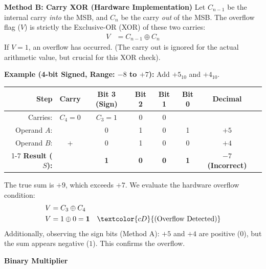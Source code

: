 \documentclass[12pt,a3paper]{article}
\newcommand{\subtopic}[2]{%
  \vspace{10pt}
  \noindent\begin{tcolorbox}[colback=#1!8,colframe=#1,boxrule=0.6pt,arc=4pt,
    left=6pt,right=6pt,top=4pt,bottom=4pt]
    \small\bfseries\textcolor{#1}{#2}
  \end{tcolorbox}
  \vspace{2pt}
}
\begin{document}
\begin{enumerate}
\begin{tcolorbox}[enhanced,breakable,ansbox,colback=cD!4,colframe=cD,boxrule=0.8pt,arc=5pt,title={\textbf{Answer}},fonttitle=\bfseries\color{white},colbacktitle=cD]
\textbf{Method B: Carry XOR (Hardware Implementation)}
Let $C_{n-1}$ be the internal carry \textit{into} the MSB, and $C_n$ be the carry \textit{out} of the MSB. The overflow flag ($V$) is strictly the Exclusive-OR (XOR) of these two carries:
\begin{align*}
    V &= C_{n-1} \oplus C_n
\end{align*}
If $V = 1$, an overflow has occurred. (The carry out is ignored for the actual arithmetic value, but crucial for this XOR check).

\textbf{Example (4-bit Signed, Range: $-8$ to $+7$):}
Add $+5_{10}$ and $+4_{10}$.
\begin{center}
\renewcommand{\arraystretch}{1.1}
\begin{tabular}{rccccccl}
\toprule
\textbf{Step} & \textbf{Carry} & \textbf{Bit 3 (Sign)} & \textbf{Bit 2} & \textbf{Bit 1} & \textbf{Bit 0} & \textbf{Decimal} \\
\midrule
Carries: & \textcolor{cD}{\textbf{$C_4 = 0$}} & \textcolor{cD}{\textbf{$C_3 = 1$}} & 0 & 0 & & \\
Operand $A$: & & 0 & 1 & 0 & 1 & $+5$ \\
Operand $B$: & + & 0 & 1 & 0 & 0 & $+4$ \\
\cmidrule{1-7}
\textbf{Result ($S$):} & & \textbf{1} & \textbf{0} & \textbf{0} & \textbf{1} & \textbf{$-7$ (Incorrect)} \\
\bottomrule
\end{tabular}
\end{center}
The true sum is $+9$, which exceeds $+7$. We evaluate the hardware overflow condition:
\begin{align*}
    V &= C_3 \oplus C_4 \\
    V &= 1 \oplus 0 = \mathbf{1} \quad \textcolor{cD}{\text{(Overflow Detected)}}
\end{align*}
Additionally, observing the sign bits (Method A): $+5$ and $+4$ are positive ($0$), but the sum appears negative ($1$). This confirms the overflow.

\end{tcolorbox}

\end{enumerate}

\subtopic{cD}{Binary Multiplier}
\label{sub:s4-multiplier}
\end{document}
